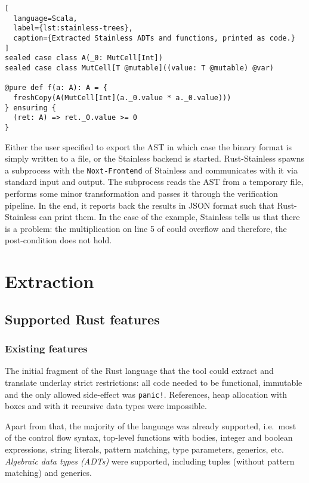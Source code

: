 \begin{lstlisting}[
  language=Scala,
  label={lst:stainless-trees},
  caption={Extracted Stainless ADTs and functions, printed as code.}
]
sealed case class A(_0: MutCell[Int])
sealed case class MutCell[T @mutable]((value: T @mutable) @var)

@pure def f(a: A): A = {
  freshCopy(A(MutCell[Int](a._0.value * a._0.value)))
} ensuring {
  (ret: A) => ret._0.value >= 0
}
\end{lstlisting}

Either the user specified to export the AST in which case the binary format is
simply written to a file, or the Stainless backend is started. Rust-Stainless
spawns a subprocess with the \passthrough{\lstinline!Noxt-Frontend!} of
Stainless and communicates with it via standard input and output. The subprocess
reads the AST from a temporary file, performs some minor transformation and
passes it through the verification pipeline. In the end, it reports back the
results in JSON format such that Rust-Stainless can print them. In the case of
the example, Stainless tells us that there is a problem: the multiplication on
line 5 of  could overflow and therefore, the
post-condition does not hold.



\section{Extraction}

\subsection{Supported Rust features}

\subsubsection{Existing features}

The initial fragment of the Rust language that the tool could extract
and translate underlay strict restrictions: all code needed to be
functional, immutable and the only allowed side-effect was
\passthrough{\lstinline"panic!"}. References, heap allocation with boxes
and with it recursive data types were impossible.

Apart from that, the majority of the language was already supported,
i.e.~most of the control flow syntax, top-level functions with bodies,
integer and boolean expressions, string literals, pattern matching, type
parameters, generics, etc. \emph{Algebraic data types (ADTs)} were
supported, including tuples (without pattern matching) and generics.

